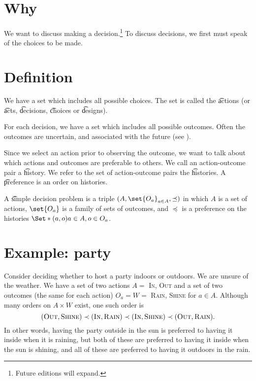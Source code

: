 
\section*{Why}

We want to discuss making a decision.\footnote{Future editions will expand.}
To discuss decisions, we first must speak of the choices to be made.

\section*{Definition}

We have a set which includes all possible choices.
The set is called the \t{actions} (or \t{acts}, \t{decisions}, \t{choices} or \t{designs}).

For each decision, we have a set which includes all possible outcomes.
Often the outcomes are uncertain, and associated with the future (see ).

Since we select an action prior to observing the outcome, we want to talk about which actions and outcomes are preferable to others.
We call an action-outcome pair a \t{history}.
We refer to the set of action-outcome pairs the \t{histories}.
A \t{preference} is an order on histories.

A \t{simple decision problem} is a triple $(A, \set{O_a}_{a \in A}, \preceq)$ in which $A$ is a set of actions, $\set{O_a}$ is a family of sets of outcomes, and $\preceq$ is a preference on the histories $\Set*{(a, o)}{a \in A, o \in O_a}$.

\section*{Example: party}

Consider deciding whether to host a party indoors or outdoors.
We are unsure of the weather.
We have a set of two actions $A = $ {\textsc{In}, \textsc{Out}} and a set of two outcomes (the same for each action) $O_a = W =$ {\textsc{Rain}, \textsc{Shine}} for $a \in A$.
Although many orders on $A \times  W$ exist, one such order is
\[
(\textsc{Out}, \textsc{Shine}) \prec (\textsc{In}, \textsc{Rain}) \prec (\textsc{In}, \textsc{Shine}) \prec (\textsc{Out}, \textsc{Rain}).
\]
In other words, having the party outside in the sun is preferred to having it inside when it is raining, but both of these are preferred to having it inside when the sun is shining, and all of these are preferred to having it outdoors in the rain.

